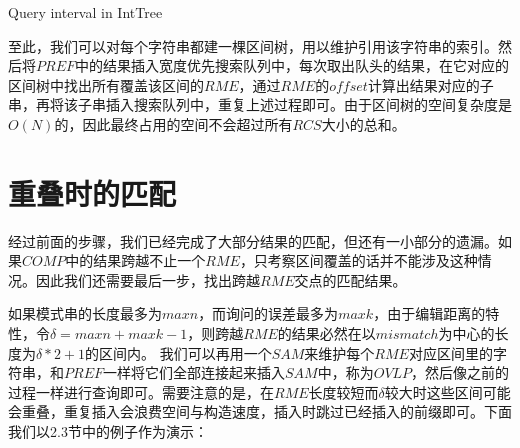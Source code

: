 ﻿\documentclass{sysuthesis}
\begin{document}
\begin{algorithm}[H]
	\caption{Query interval in IntTree}\label{algo:intquery}
\end{algorithm}

至此，我们可以对每个字符串都建一棵区间树，用以维护引用该字符串的索引。然后将$PREF$中的结果插入宽度优先搜索队列中，每次取出队头的结果，在它对应的区间树中找出所有覆盖该区间的$RME$，通过$RME$的$offset$计算出结果对应的子串，再将该子串插入搜索队列中，重复上述过程即可。由于区间树的空间复杂度是$O(N)$的，因此最终占用的空间不会超过所有$RCS$大小的总和。



\section{重叠时的匹配}
经过前面的步骤，我们已经完成了大部分结果的匹配，但还有一小部分的遗漏。如果$COMP$中的结果跨越不止一个$RME$，只考察区间覆盖的话并不能涉及这种情况。因此我们还需要最后一步，找出跨越$RME$交点的匹配结果。\par
如果模式串的长度最多为$maxn$，而询问的误差最多为$maxk$，由于编辑距离的特性，令$\delta = maxn + maxk - 1$，则跨越$RME$的结果必然在以$mismatch$为中心的长度为$\delta * 2 + 1$的区间内。
我们可以再用一个$SAM$来维护每个$RME$对应区间里的字符串，和$PREF$一样将它们全部连接起来插入$SAM$中，称为$OVLP$，然后像之前的过程一样进行查询即可。需要注意的是，在$RME$长度较短而$\delta$较大时这些区间可能会重叠，重复插入会浪费空间与构造速度，插入时跳过已经插入的前缀即可。下面我们以2.3节中的例子作为演示：\par
\end{document}
